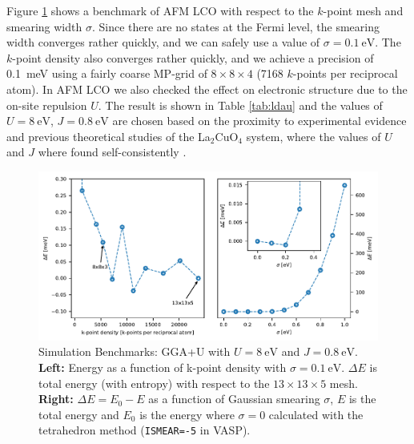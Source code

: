 Figure \ref{fig:sim_bench_afm} shows a benchmark of AFM LCO with respect to the $k$-point mesh and smearing width $\sigma$. Since there are no states at the Fermi level, the smearing width converges rather quickly, and we can safely use a value of $\sigma = \SI{0.1}{\eV}$. The $k$-point density also converges rather quickly, and we achieve a precision of \SI{0.1}{\milli\eV} using a fairly coarse MP-grid of $8\times 8 \times 4$ (7168 $k$-points per reciprocal atom). In AFM LCO we also checked the effect on electronic structure due to the on-site repulsion $U$. The result is shown in Table \ref{tab:ldau} and the values of $U=\SI{8}{\eV}$, $J=\SI{0.8}{\eV}$ are chosen based on the proximity to experimental evidence \cite{Vaknin1987, Uchida1991} and previous theoretical studies of the La$_2$CuO$_4$ system, where the values of $U$ and $J$ where found self-consistently \cite{Anisimov2004,Anisimov1991}.

\begin{figure}
    \centering
    \includegraphics[width=\textwidth]{fig/simulation/convergence_afm.pdf}
    \caption[Simulation Benchmarks: GGA+U]{Simulation Benchmarks: GGA+U with $U=\SI{8}{\eV}$ and $J=\SI{0.8}{\eV}$. \textbf{Left:} Energy as a function of k-point density with $\sigma=\SI{0.1}{\eV}$. $\Delta E$ is total energy (with entropy) with respect to the $13 \times 13 \times 5$ mesh. \textbf{Right:} $\Delta E = E_0 - E$ as a function of Gaussian smearing $\sigma$, $E$ is the total energy and $E_0$ is the energy where $\sigma=0$ calculated with the tetrahedron method (\texttt{ISMEAR=-5} in VASP).}
    \label{fig:sim_bench_afm}
\end{figure}

